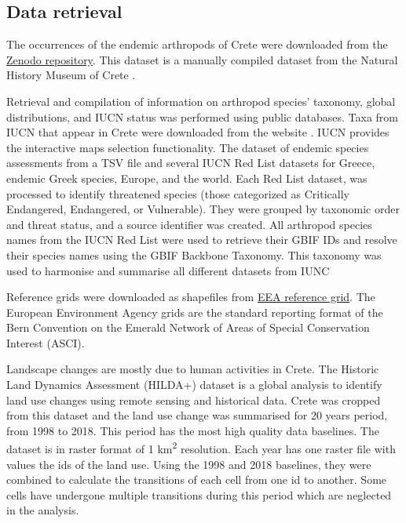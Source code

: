    \subsection{Data retrieval}
    \label{subsec:arthropods-land-use}

The occurrences of the endemic arthropods of Crete were downloaded from the
\href{https://zenodo.org/records/10635645}{Zenodo repository}. This dataset
is a manually compiled dataset from the Natural History Museum of Crete \parencite{bolanakis2024}.

Retrieval and compilation of information on arthropod species' taxonomy,
global distributions, and IUCN status was performed using public databases.
Taxa from IUCN that appear in Crete were downloaded from the website \parencite{iucn2024}. IUCN provides the 
interactive maps selection functionality. 
The dataset of endemic species assessments from a TSV file and several IUCN Red
List datasets for Greece, endemic Greek species, Europe, and the world.
Each Red List dataset, was processed to identify threatened species
(those categorized as Critically Endangered, Endangered, or Vulnerable).
They were grouped by taxonomic order and threat status, and a source identifier was created.
All arthropod species names from the IUCN Red List were used to retrieve their GBIF IDs
and resolve their species names using the GBIF Backbone Taxonomy.
This taxonomy was used to harmonise and summarise all different datasets from IUNC

Reference grids were downloaded as shapefiles from \href{https://www.eea.europa.eu/en/datahub/datahubitem-view/3c362237-daa4-45e2-8c16-aaadfb1a003b}{EEA reference grid}.
The European Environment Agency grids are the standard reporting format of the Bern Convention
on the Emerald Network of Areas of Special Conservation Interest (ASCI).

Landscape changes are mostly due to human activities in Crete.
The Historic Land Dynamics Assessment (HILDA+) dataset \parencite{winkler2021global}
is a global analysis to identify land use changes using remote sensing and 
historical data. Crete was cropped from this dataset and the land use change was 
summarised for 20 years period, from 1998 to 2018. This period has the most 
high quality data baselines. The dataset is in raster format of 1 km\textsuperscript{2}
resolution. Each year has one raster file with values the ids of the land use. 
Using the 1998 and 2018 baselines, they were combined to calculate the 
transitions of each cell from one id to another. Some cells have undergone 
multiple transitions during this period which are neglected in the analysis.

